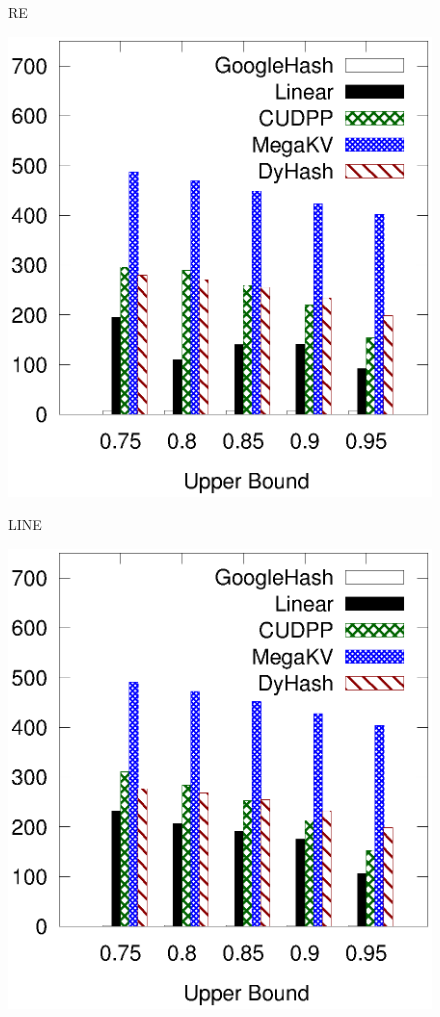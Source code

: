 \begin{figure}[t]
\begin{minipage}{0.19\linewidth}
		\centerline{RE}
	\end{minipage}
	\hfill
	\begin{minipage}{0.19\linewidth}\centering
		\includegraphics[width=\linewidth]{pic/static-upper/upper_insert_tpch.eps}
		\centerline{LINE}
	\end{minipage}
	\hfill
	\begin{minipage}{0.19\linewidth}\centering
		\includegraphics[width=\linewidth]{pic/static-upper/upper_insert_random.eps}

\end{minipage}
\end{figure}
